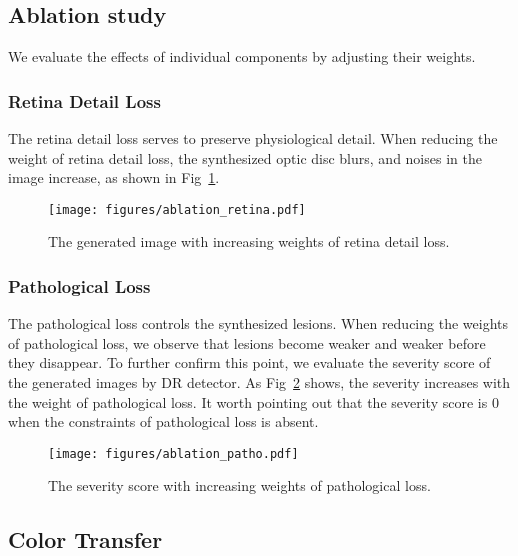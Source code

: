 \documentclass[letterpaper]{article} %
\begin{document}
	\subsection{Ablation study}

    We evaluate the effects of individual components by adjusting their weights.


    \subsubsection{Retina Detail Loss}

	The retina detail loss serves to preserve physiological detail. When reducing the weight of retina detail loss, the synthesized optic disc blurs, and noises in the image increase, as shown in Fig~\ref{fig:ablation_retina}.

	\begin{figure}[t]
		\begin{center}
			\texttt{[image: figures/ablation\_retina.pdf]}
		\end{center}
		\caption{The generated image with increasing weights of retina detail loss.}
		\label{fig:ablation_retina}
	\end{figure}



    \subsubsection{Pathological Loss}

    The pathological loss controls the synthesized lesions. When reducing the weights of pathological loss, we observe that lesions become weaker and weaker before they disappear. To further confirm this point, we evaluate the severity score of the generated images by DR detector. As Fig~\ref{fig:ablation_patho} shows, the severity increases with the weight of pathological loss. It worth pointing out that the severity score is $0$ when the constraints of pathological loss is absent.


	\begin{figure}[h!]
		\begin{center}
			\texttt{[image: figures/ablation\_patho.pdf]}
		\end{center}
		\caption{The severity score with increasing weights of pathological loss.}
		\label{fig:ablation_patho}
	\end{figure}



        \subsection{Color Transfer}
\end{document}
